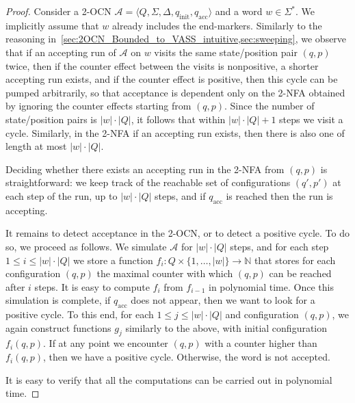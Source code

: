 \documentclass[USenglish]{lipics-v2021}
\newcommand{\tup}[1]{\langle #1 \rangle}
\newcommand{\initstate}{q_{\mathrm{init}}}
\newcommand{\accstate}{q_{\mathrm{acc}}}
\newcommand{\bbN}{\mathbb{N}}
\newcommand{\cA}{\mathcal{A}}
\begin{document}
\begin{proof} 
	Consider a 2-OCN $\cA=\tup{Q,\Sigma,\Delta,\initstate,\accstate}$ and a word
	$w\in \Sigma^*$. We implicitly assume that $w$ already includes the end-markers.
	Similarly to the reasoning 
	in~\cref{sec:2OCN_Bounded_to_VASS_intuitive,sec:sweeping}, we observe that
	if an accepting run of $\cA$ on $w$ visits the same state/position pair
	$(q,p)$ twice, then if the counter effect between the visits is
	nonpositive, a shorter accepting run exists, and if the counter effect
	is positive, then this cycle can be pumped arbitrarily, so that acceptance
	is dependent only on the 2-NFA obtained by ignoring the counter effects starting from $(q,p)$.
	Since the number of state/position pairs is $|w|\cdot |Q|$, it follows that
	within $|w|\cdot |Q|+1$ steps we visit a cycle. Similarly, in the 2-NFA if an accepting run exists, then there is also one of length at most $|w|\cdot |Q|$.
	
	Deciding whether there exists an accepting run in the 2-NFA from $(q,p)$ is straightforward: we keep track of the reachable set of configurations $(q',p')$ at each step of the run, up to $|w|\cdot |Q|$ steps, and if $\accstate$ is reached then the run is accepting.
	
	It remains to detect acceptance in the 2-OCN, or to detect a positive cycle. To do so, we proceed as follows. We simulate $\cA$ for $|w|\cdot |Q|$ steps, and for each step $1\le i\le |w|\cdot |Q|$ we store a function $f_i\colon Q\times \{1,\ldots,|w|\}\to \bbN$ that stores for each configuration $(q,p)$ the maximal counter with which $(q,p)$ can be reached after $i$ steps. It is easy to compute $f_i$ from $f_{i-1}$ in polynomial time. Once this simulation is complete, if $\accstate$ does not appear, then we want to look for a positive cycle.
	To this end, for each $1\le j\le |w|\cdot |Q|$ and configuration $(q,p)$, we again construct functions $g_j$ similarly to the above, with initial configuration $f_i(q,p)$. If at any point we encounter $(q,p)$ with a counter higher than $f_i(q,p)$, then we have a positive cycle. Otherwise, the word is not accepted.
	
	It is easy to verify that all the computations can be carried out in polynomial time.
\end{proof}
\end{document}
